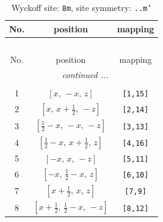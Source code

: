 \documentclass[fleqn,8pt]{jsarticle}
\begin{document}
\begin{longtable}{ccc}
\caption{Wyckoff site: {\tt 8m}, site symmetry: {\tt ..m'}}
 \\
 \hline \hline
No. & position & mapping \\ \hline \endfirsthead

\multicolumn{2}{l}{\tablename\ \thetable{}} \\
 \hline \hline
No. & position & mapping \\ \hline \endhead

 \hline \hline
\multicolumn{2}{r}{\footnotesize\it continued ...} \\ \endfoot

 \hline \hline
\multicolumn{2}{r}{} \\ \endlastfoot

1 & $\left[ x,\, - x,\, z \right]$ & {\tt [1,15]} \\ \hline
2 & $\left[ x,\, x + \frac{1}{2},\, - z \right]$ & {\tt [2,14]} \\ \hline
3 & $\left[ \frac{1}{2} - x,\, - x,\, - z \right]$ & {\tt [3,13]} \\ \hline
4 & $\left[ \frac{1}{2} - x,\, x + \frac{1}{2},\, z \right]$ & {\tt [4,16]} \\ \hline
5 & $\left[ - x,\, x,\, - z \right]$ & {\tt [5,11]} \\ \hline
6 & $\left[ - x,\, \frac{1}{2} - x,\, z \right]$ & {\tt [6,10]} \\ \hline
7 & $\left[ x + \frac{1}{2},\, x,\, z \right]$ & {\tt [7,9]} \\ \hline
8 & $\left[ x + \frac{1}{2},\, \frac{1}{2} - x,\, - z \right]$ & {\tt [8,12]} \\
\end{longtable}
\renewcommand{\arraystretch}{1.2}
\end{document}
